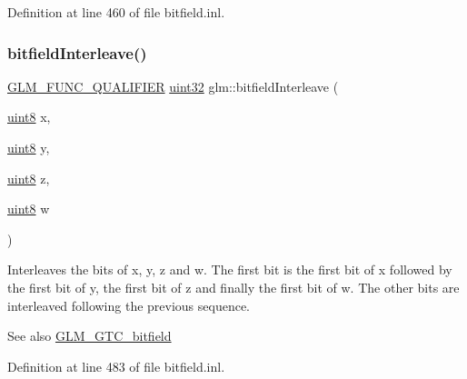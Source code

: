 Definition at line 460 of file bitfield.\+inl.

\mbox{\label{group__gtc__bitfield_ga447c0bbed9d60c14578626d8f03f3755}} 
\subsubsection{\texorpdfstring{bitfieldInterleave()}{bitfieldInterleave()}\hspace{0.1cm}{\footnotesize\ttfamily [14/16]}}
{\footnotesize\ttfamily \mbox{\hyperlink{setup_8hpp_a33fdea6f91c5f834105f7415e2a64407}{G\+L\+M\+\_\+\+F\+U\+N\+C\+\_\+\+Q\+U\+A\+L\+I\+F\+I\+ER}} \mbox{\hyperlink{group__gtc__type__precision_ga202b6a53c105fcb7e531f9b443518451}{uint32}} glm\+::bitfield\+Interleave (\begin{DoxyParamCaption}\item[{\mbox{\hyperlink{group__gtc__type__precision_ga1a7dcd8aac97cc8020817c94049deff2}{uint8}}}]{x,  }\item[{\mbox{\hyperlink{group__gtc__type__precision_ga1a7dcd8aac97cc8020817c94049deff2}{uint8}}}]{y,  }\item[{\mbox{\hyperlink{group__gtc__type__precision_ga1a7dcd8aac97cc8020817c94049deff2}{uint8}}}]{z,  }\item[{\mbox{\hyperlink{group__gtc__type__precision_ga1a7dcd8aac97cc8020817c94049deff2}{uint8}}}]{w }\end{DoxyParamCaption})}

Interleaves the bits of x, y, z and w. The first bit is the first bit of x followed by the first bit of y, the first bit of z and finally the first bit of w. The other bits are interleaved following the previous sequence.

\begin{DoxySeeAlso}{See also}
\mbox{\hyperlink{group__gtc__bitfield}{G\+L\+M\+\_\+\+G\+T\+C\+\_\+bitfield}} 
\end{DoxySeeAlso}


Definition at line 483 of file bitfield.\+inl.

\mbox{\label{group__gtc__bitfield_ga09ee0be0fac790a1607a711e597dd9bf}} 
